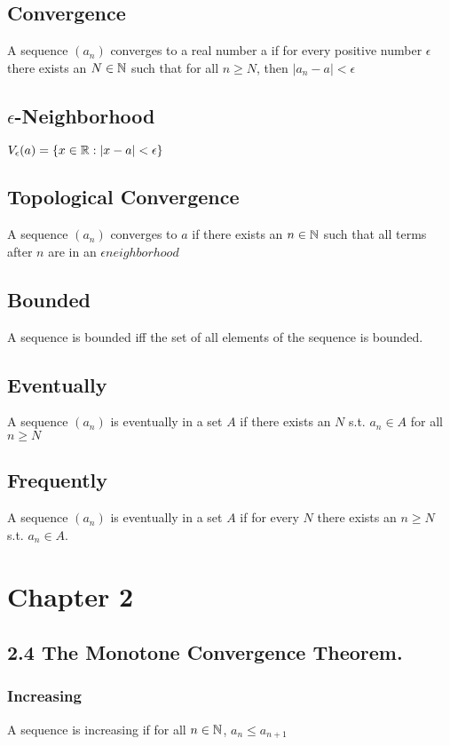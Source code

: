 \documentclass{article}
\begin{document}
\subsection{Convergence}
A sequence $(a_n)$ converges to a real number a if for every positive number $\epsilon$ there exists an $N \in \protect\mathbb{N}$ such that for all $n \ge N$, then $|a_n - a| < \epsilon$

\subsection{$\epsilon$-Neighborhood}
$V_\epsilon (a) = \{x \in \protect\mathbb{R} : |x-a| < \epsilon\}$

\subsection{Topological Convergence}
A sequence $(a_n)$ converges to $a$ if there exists an $n \in \protect\mathbb{N}$ such that all terms after $n$ are in an $\epsilon neighborhood$

\subsection{Bounded}
A sequence is bounded iff the set of all elements of the sequence is bounded.

\subsection{Eventually}
A sequence $(a_n)$ is eventually in a set $A$ if there exists an $N$ s.t. $a_n \in A$ for all $n \ge N$

\subsection{Frequently}
A sequence $(a_n)$ is eventually in a set $A$ if for every $N$  there exists an $n \ge N$ s.t. $a_n \in A$.

\section*{Chapter 2}
\subsection*{2.4 The Monotone Convergence Theorem.}

\subsubsection*{Increasing}
A sequence is increasing if for all $n \in \protect\mathbb{N}$, $a_n \le a_{n+1}$
\end{document}
